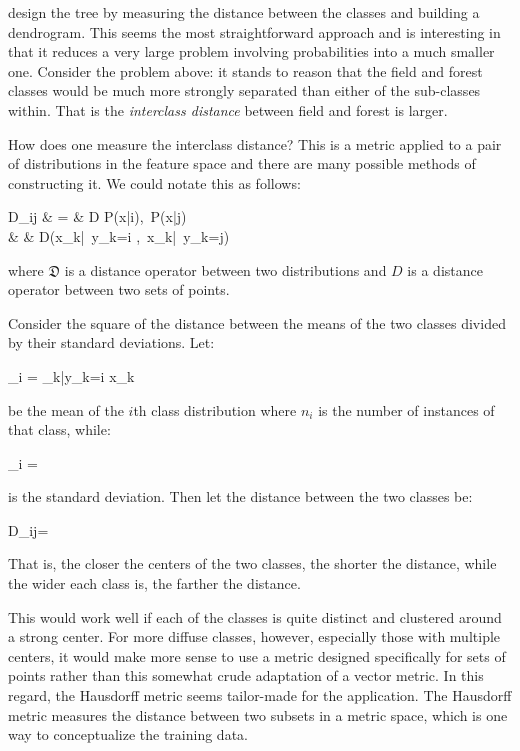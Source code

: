 \citet{Benabdeslem_Bennani2006} design the tree by measuring the distance between
the classes and building a dendrogram.
This seems the most straightforward approach and is interesting in that it reduces a very large problem involving probabilities into a much smaller one.
Consider the problem above: it stands to reason that the field and forest classes would be much more strongly separated than either of the sub-classes within.
That is the {\it interclass distance} between field and forest is larger.

How does one measure the interclass distance? 
This is a metric applied to a pair of distributions in the feature space
and there are many possible methods of constructing it.
We could notate this as follows:
\begin{eqnarraynon}
	D_{ij} & = & \mathfrak D \left \lbrace P(\vec x|i),~P(\vec x|j) \right \rbrace \\
	       & \approx & D\left (\lbrace \vec x_k|~y_k=i \rbrace,~\lbrace \vec x_k|~y_k=j\rbrace \right )
\end{eqnarraynon}
where $\mathfrak D$ is a distance operator between two distributions and $D$ is a distance operator between two sets of points.

Consider the square of the distance between the means of the two classes divided by their standard deviations. Let:
\begin{eqnnon}
	\vec \mu_i =  \sum_{k|y_k=i} \vec x_k
\end{eqnnon}
be the mean of the $i$th class distribution where $n_i$ is the number of instances of that class, while:
\begin{eqnnon}
	\sigma_i = 
\end{eqnnon}
is the standard deviation.
Then let the distance between the two classes be:
\begin{eqnnon}
	D_{ij}=
\end{eqnnon}
That is, the closer the centers of the two classes, the shorter the distance, while the wider each class is, the farther the distance.
	
This would work well if each of the classes is quite distinct and clustered around a strong center.
For more diffuse classes, however, especially those with multiple centers, it would make more sense to use a metric designed specifically for sets of points rather than this somewhat crude adaptation of a vector metric.
In this regard, the Hausdorff metric seems tailor-made for the application.
The Hausdorff metric measures the distance between two subsets in a metric space, which is one way to conceptualize the training data.

